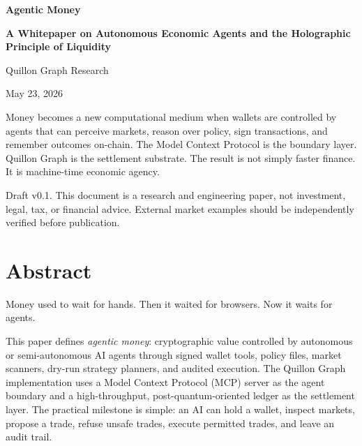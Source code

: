\documentclass[11pt,a4paper]{article}
\begin{document}
\begin{titlepage}
  \centering
  \vspace*{1.0cm}
  {\Huge\bfseries\color{quillonblue} Agentic Money\par}
  \vspace{0.25cm}
  {\Large\bfseries A Whitepaper on Autonomous Economic Agents and the Holographic Principle of Liquidity\par}
  \vspace{0.9cm}
  {\large Quillon Graph Research\par}
  \vspace{0.2cm}
  {\large May 23, 2026\par}
  \vfill
  \begin{principlebox}[Thesis]
  Money becomes a new computational medium when wallets are controlled by agents that can perceive markets, reason over policy, sign transactions, and remember outcomes on-chain. The Model Context Protocol is the boundary layer. Quillon Graph is the settlement substrate. The result is not simply faster finance. It is machine-time economic agency.
  \end{principlebox}
  \vfill
  {\small Draft v0.1. This document is a research and engineering paper, not investment, legal, tax, or financial advice. External market examples should be independently verified before publication.}
\end{titlepage}

\tableofcontents
\newpage
{}

\section*{Abstract}

Money used to wait for hands. Then it waited for browsers. Now it waits for agents.

This paper defines \emph{agentic money}: cryptographic value controlled by autonomous or semi-autonomous AI agents through signed wallet tools, policy files, market scanners, dry-run strategy planners, and audited execution. The Quillon Graph implementation uses a Model Context Protocol (MCP) server as the agent boundary and a high-throughput, post-quantum-oriented ledger as the settlement layer. The practical milestone is simple: an AI can hold a wallet, inspect markets, propose a trade, refuse unsafe trades, execute permitted trades, and leave an audit trail.
\end{document}
